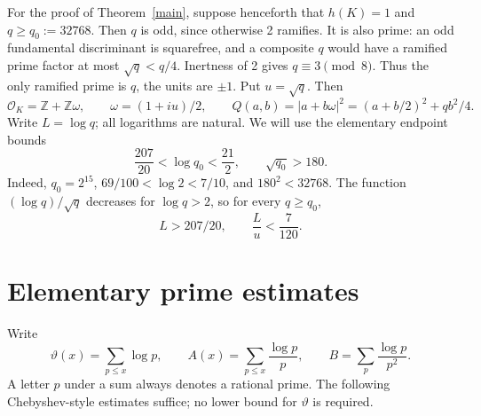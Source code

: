 \documentclass[11pt]{article}
\newcommand{\Z}{\mathbb Z}
\newcommand{\OK}{\mathcal O_K}
\begin{document}
For the proof of Theorem~\ref{main}, suppose henceforth that
\(h(K)=1\) and \(q\ge q_0:=32768\). Then \(q\) is odd, since
otherwise 2 ramifies. It is also prime: an odd fundamental
discriminant is squarefree, and a composite \(q\) would have a
ramified prime factor at most \(\sqrt q<q/4\). Inertness of 2 gives
\(q\equiv3\pmod8\). Thus the only ramified prime is \(q\), the units
are \(\pm1\). Put \(u=\sqrt q\). Then
\begin{equation}\label{norm-form}
 \OK=\Z+\Z\omega,\qquad \omega=(1+iu)/2,\qquad
 Q(a,b)=|a+b\omega|^2=(a+b/2)^2+qb^2/4.
\end{equation}
Write \(L=\log q\); all logarithms are natural.
We will use the elementary endpoint bounds
\begin{equation}\label{endpoint}
 \frac{207}{20}<\log q_0<\frac{21}{2},\qquad
 \sqrt{q_0}>180.
\end{equation}
Indeed, \(q_0=2^{15}\), \(69/100<\log2<7/10\), and
\(180^2<32768\). The function \((\log q)/\sqrt q\) decreases for
\(\log q>2\), so for every \(q\ge q_0\),
\begin{equation}\label{uniform-endpoint}
 L>207/20,\qquad \frac Lu<\frac7{120}.
\end{equation}

\section{Elementary prime estimates}\label{primes}

Write
\[
 \vartheta(x)=\sum_{p\le x}\log p,\qquad
 A(x)=\sum_{p\le x}\frac{\log p}{p},\qquad
 B=\sum_p\frac{\log p}{p^2}.
\]
A letter \(p\) under a sum always denotes a rational prime. The
following Chebyshev-style estimates suffice; no lower bound for
\(\vartheta\) is required.
\end{document}
